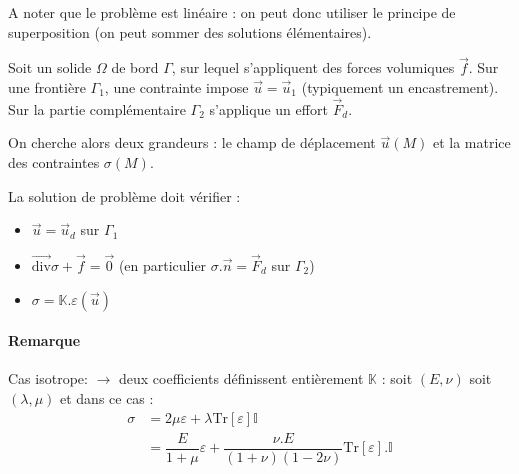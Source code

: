 \documentclass{article}
\begin{document}
A noter que le problème est linéaire : on peut donc utiliser le principe de superposition (on peut sommer des solutions élémentaires).
\bigskip

Soit un solide $\Omega$ de bord $\Gamma$, sur lequel s'appliquent des forces volumiques $\vec{f}$. Sur une frontière $\Gamma_1$, une contrainte impose $\vec{u} = \vec{u}_1$ (typiquement un encastrement). Sur la partie complémentaire $\Gamma_2$ s'applique un effort $\vec{F}_d$.
\bigskip

On cherche alors deux grandeurs : le champ de déplacement $\vec{u}(M)$ et la matrice des contraintes $\sigma(M)$.
\bigskip

La solution de problème doit vérifier :
\begin{itemize}[label=$\star$]
\item $\vec{u}=\vec{u}_d$ sur $\Gamma_1$
\item $\overrightarrow{\text{div}} \sigma + \vec{f} = \vec{0}$ (en particulier $\sigma.\vec{n} = \vec{F}_d$ sur $\Gamma_2$)
\item $\sigma=\mathbb{K}.\varepsilon(\vec{u})$
\end{itemize}

\paragraph{Remarque} Cas isotrope: $\to$ deux coefficients définissent entièrement $\mathbb{K}$ : soit $(E,\nu)$ soit $(\lambda, \mu)$ et dans ce cas :
\begin{align*}
\sigma & = 2\mu \varepsilon + \lambda \text{Tr} [\varepsilon] \mathbb{I}\\
& = \dfrac{E}{1 + \mu}\varepsilon + \dfrac{\nu.E}{(1+\nu)(1-2\nu)}\text{Tr}[\varepsilon] . \mathbb{I}\\
\end{align*}
\end{document}

